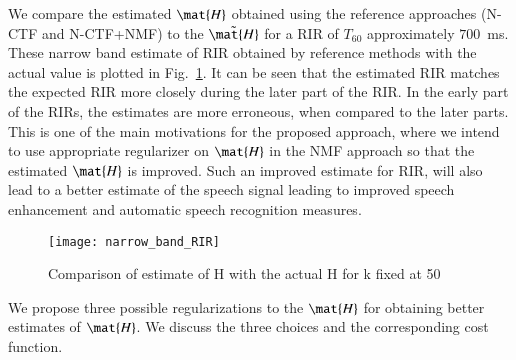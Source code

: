We compare the estimated $\mat{H}$ obtained using the reference approaches (N-CTF and N-CTF+NMF) to the
$\tilde{\mat{H}}$ for a RIR of $T_{60}$ approximately $700$~ms. These narrow band estimate of RIR obtained by reference methods with the actual value is plotted in Fig.~\ref{fig:compare_RIR_NMF}. It can be seen that the estimated RIR matches the expected RIR more closely during the later part of the RIR.  In the early part of the RIRs, the estimates are more erroneous, when compared to
the later parts. This is one of the main motivations for the proposed approach,
where we intend to use appropriate regularizer on $\mat{H}$ in the NMF approach
so that the estimated $\mat{H}$ is improved. Such an improved estimate for RIR,
will also lead to a better estimate of the speech signal leading to improved
speech enhancement and automatic speech recognition measures.
\begin{figure}
\centering
\texttt{[image: narrow\_band\_RIR]}
\caption{Comparison of estimate of H with the actual H for k fixed at 50}
\label{fig:compare_RIR_NMF}
\end{figure}

We propose three possible regularizations to the $\mat{H}$ for obtaining better
estimates of $\mat{H}$. We discuss the three choices and the corresponding cost
function.
